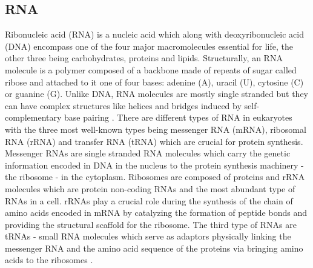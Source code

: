 \subsection{RNA}

Ribonucleic acid (RNA) is a nucleic acid which along with deoxyribonucleic acid (DNA) encompass one of the four major macromolecules essential for life, the other three being carbohydrates, proteins and lipids. Structurally, an RNA molecule is a polymer composed of a backbone made of repeats of sugar called ribose and attached to it one of four bases: adenine (A), uracil (U), cytosine (C) or guanine (G). Unlike DNA, RNA molecules are mostly single stranded but they can have complex structures like helices and bridges induced by self-complementary base pairing \citep{AlbertsB2002MolecularEdition}. There are different types of RNA in eukaryotes with the three most well-known types being messenger RNA (mRNA), ribosomal RNA (rRNA) and transfer RNA (tRNA) which are crucial for protein synthesis. Messenger RNAs are single stranded RNA molecules which carry the genetic information encoded in DNA in the nucleus to the protein synthesis machinery - the ribosome - in the cytoplasm. Ribosomes are composed of proteins and rRNA molecules which are protein non-coding RNAs and the most abundant type of RNAs in a cell. rRNAs play a crucial role during the synthesis of the chain of amino acids encoded in mRNA by catalyzing the formation of peptide bonds and providing the structural scaffold for the ribosome. The third type of RNAs are tRNAs - small RNA molecules which serve as adaptors physically linking the messenger RNA and the amino acid sequence of the proteins via bringing amino acids to the ribosomes \citep{Solomon2007}.


